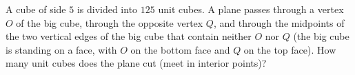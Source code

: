 A cube of side $5$ is divided into $125$ unit cubes. A plane passes through a vertex $O$ of the big cube, through the opposite vertex $Q$, and through the midpoints of the two vertical edges of the big cube that contain neither $O$ nor $Q$ (the big cube is standing on a face, with $O$ on the bottom face and $Q$ on the top face). How many unit cubes does the plane cut (meet in interior points)?

